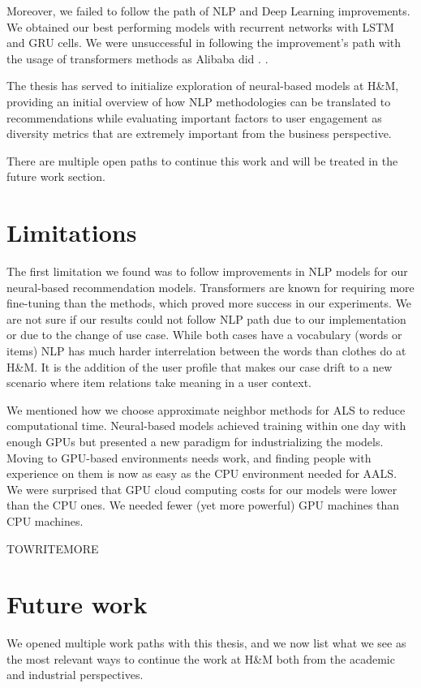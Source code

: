 \documentclass{kththesis}
\begin{document}
Moreover, we failed to follow the path of NLP and Deep Learning improvements. We obtained our best performing models with recurrent networks with LSTM and GRU cells. We were unsuccessful in following the improvement's path with the usage of transformers methods as Alibaba did \cite{alibaba}.  
\cite{sun2019bert4rec}.

The thesis has served to initialize exploration of neural-based models at H\&M, providing an initial overview of how NLP methodologies can be translated to recommendations while evaluating important factors to user engagement as diversity metrics that are extremely important from the business perspective. 

There are multiple open paths to continue this work and will be treated in the future work section.

\section{Limitations}
The first limitation we found was to follow improvements in NLP models for our neural-based recommendation models. Transformers are known for requiring more fine-tuning than the methods, which proved more success in our experiments. We are not sure if our results could not follow NLP path due to our implementation or due to the change of use case. While both cases have a vocabulary (words or items) NLP has much harder interrelation between the words than clothes do at H\&M. It is the addition of the user profile that makes our case drift to a new scenario where item relations take meaning in a user context.

We mentioned how we choose approximate neighbor methods for ALS to reduce computational time. Neural-based models achieved training within one day with enough GPUs but presented a new paradigm for industrializing the models. Moving to GPU-based environments needs work, and finding people with experience on them is now as easy as the CPU environment needed for AALS. We were surprised that GPU cloud computing costs for our models were lower than the CPU ones. We needed fewer (yet more powerful) GPU machines than CPU machines.

TOWRITEMORE


\section{Future work}
We opened multiple work paths with this thesis, and we now list what we see as the most relevant ways to continue the work at H\&M both from the academic and industrial perspectives.
\end{document}
